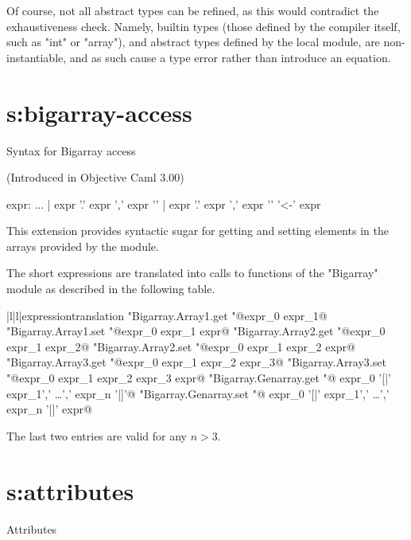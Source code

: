 Of course, not all abstract types can be refined, as this would
contradict the exhaustiveness check. Namely, builtin types (those
defined by the compiler itself, such as "int" or "array"), and
abstract types defined by the local module, are non-instantiable, and
as such cause a type error rather than introduce an equation.

\section{s:bigarray-access}{Syntax for Bigarray access}

(Introduced in Objective Caml 3.00)

\begin{syntax}
expr:
          ...
        | expr '.{' expr { ',' expr } '}'
        | expr '.{' expr { ',' expr } '}' '<-' expr
\end{syntax}

This extension provides syntactic sugar for getting and setting
elements in the arrays provided by the  module.

The short expressions are translated into calls to functions of the
"Bigarray" module as described in the following table.

\begin{tableau}{|l|l|}{expression}{translation}
       {"Bigarray.Array1.get "@expr_0 expr_1@}
       {"Bigarray.Array1.set "@expr_0 expr_1 expr@}
       {"Bigarray.Array2.get "@expr_0 expr_1 expr_2@}
       {"Bigarray.Array2.set "@expr_0 expr_1 expr_2 expr@}
       {"Bigarray.Array3.get "@expr_0 expr_1 expr_2 expr_3@}
       {"Bigarray.Array3.set "@expr_0 expr_1 expr_2 expr_3 expr@}
       {"Bigarray.Genarray.get "@ expr_0 '[|' expr_1',' \ldots ','
        expr_n '|]'@}
       {"Bigarray.Genarray.set "@ expr_0 '[|' expr_1',' \ldots ','
        expr_n '|]' expr@}
\end{tableau}

The last two entries are valid for any $n > 3$.

\section{s:attributes}{Attributes}

